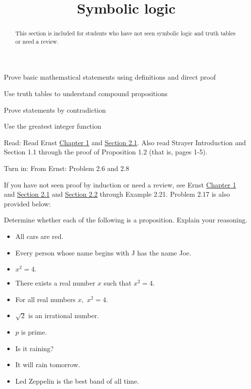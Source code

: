 \documentclass{ximera}
\title{Symbolic logic}
\begin{document}
\begin{abstract}
  This section is included for students who have not seen symbolic logic and truth tables or need a review.
\end{abstract}
\maketitle


\begin{obj}
  \item Prove basic mathematical statements using definitions and direct proof
  \item Use truth tables to understand compound propositions
  \item Prove statements by contradiction
  \item Use the greatest integer function
\end{obj}
 

\begin{pre}
  \item[Read:]  Read Ernst  \href{https://danaernst.com/IBL-IntroToProof/pretext/chap_intro.html}{Chapter 1} and \href{https://danaernst.com/IBL-IntroToProof/pretext/sec_baby_number_theory.html}{Section 2.1}. Also read Strayer Introduction and Section 1.1 through the proof of Proposition 1.2 (that is, pages 1-5).
  
  \item[Turn in:] From Ernst: Problem 2.6 and 2.8
\end{pre}


If you have not seen proof by induction or need a review, see Ernst  \href{https://danaernst.com/IBL-IntroToProof/pretext/chap_intro.html}{Chapter 1} and \href{https://danaernst.com/IBL-IntroToProof/pretext/sec_baby_number_theory.html}{Section 2.1}
and \href{https://danaernst.com/IBL-IntroToProof/pretext/sec_Intro_to_Logic.html}{Section 2.2} through Example 2.21. Problem 2.17 is also provided below:


\begin{br}
  Determine whether each of the following is a proposition. Explain your reasoning.

  \begin{itemize}
    \item All cars are red.
    \item Every person whose name begins with J has the name Joe.
    \item $x^2=4.$
    \item There exists a real number $x$ such that $x^2=4$.
    \item For all real numbers $x,$ $x^2=4.$
    \item $\sqrt{2}$ is an irrational number.
    \item $p$ is prime.
    \item Is it raining?
    \item It will rain tomorrow.
    \item Led Zeppelin is the best band of all time.
  \end{itemize}
\end{br}
\end{document}
